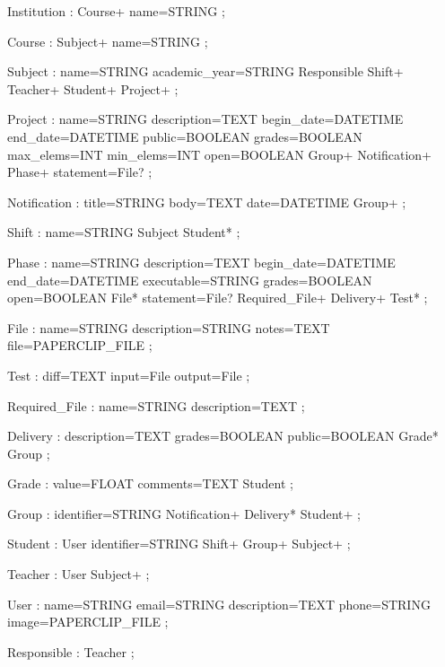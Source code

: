 \begin{spverbatim}
Institution : Course+ name=STRING 
            ;

Course : Subject+ name=STRING 
       ;

Subject : name=STRING academic_year=STRING Responsible Shift+ Teacher+ Student+ Project+ 
        ;

Project : name=STRING description=TEXT begin_date=DATETIME end_date=DATETIME public=BOOLEAN grades=BOOLEAN max_elems=INT min_elems=INT open=BOOLEAN Group+ Notification+ Phase+ statement=File?
        ;

Notification : title=STRING body=TEXT date=DATETIME Group+ 
             ;

Shift : name=STRING Subject Student* 
      ;

Phase : name=STRING description=TEXT begin_date=DATETIME end_date=DATETIME executable=STRING grades=BOOLEAN open=BOOLEAN File* statement=File? Required_File+ Delivery+ Test* 
      ;

File : name=STRING description=STRING notes=TEXT file=PAPERCLIP_FILE 
     ;

Test : diff=TEXT input=File output=File 
     ;

Required_File : name=STRING description=TEXT 
              ;

Delivery : description=TEXT grades=BOOLEAN public=BOOLEAN Grade* Group 
         ;

Grade : value=FLOAT comments=TEXT Student 
      ;

Group : identifier=STRING Notification+ Delivery* Student+ 
      ;

Student : User identifier=STRING Shift+ Group+ Subject+ 
        ;

Teacher : User Subject+ 
        ;

User : name=STRING email=STRING description=TEXT phone=STRING image=PAPERCLIP_FILE 
     ;

Responsible : Teacher 
            ;            
\end{spverbatim}


